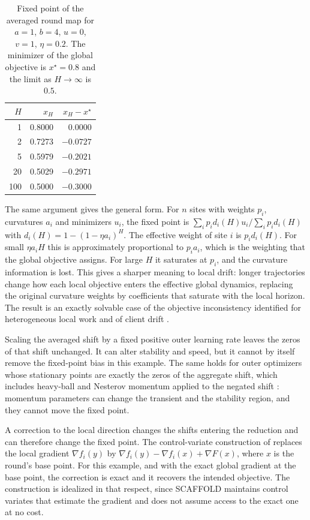\documentclass[11pt]{article}
\theoremstyle{definition}
\theoremstyle{remark}
\begin{document}
\begin{table}[h]
\centering
\begin{tabular}{rrr}
\toprule
$H$ & $x_H$ & $x_H-x^\star$\\
\midrule
1 & 0.8000 & 0.0000\\
2 & 0.7273 & $-0.0727$\\
5 & 0.5979 & $-0.2021$\\
20 & 0.5029 & $-0.2971$\\
100 & 0.5000 & $-0.3000$\\
\bottomrule
\end{tabular}
\caption{Fixed point of the averaged round map for $a=1$, $b=4$, $u=0$, $v=1$, $\eta=0.2$. The minimizer of the global objective is $x^\star=0.8$ and the limit as $H\to\infty$ is $0.5$.}
\label{tab:bias}
\end{table}

The same argument gives the general form. For $n$ sites with weights $p_i$, curvatures $a_i$ and minimizers $u_i$, the fixed point is $\sum_i p_i d_i(H)u_i\big/\sum_i p_id_i(H)$ with $d_i(H)=1-(1-\eta a_i)^H$. The effective weight of site $i$ is $p_id_i(H)$. For small $\eta a_iH$ this is approximately proportional to $p_ia_i$, which is the weighting that the global objective assigns. For large $H$ it saturates at $p_i$, and the curvature information is lost. This gives a sharper meaning to local drift: longer trajectories change how each local objective enters the effective global dynamics, replacing the original curvature weights by coefficients that saturate with the local horizon. The result is an exactly solvable case of the objective inconsistency identified for heterogeneous local work \cite{wang2020} and of client drift \cite{karimireddy2020}.

Scaling the averaged shift by a fixed positive outer learning rate leaves the zeros of that shift unchanged. It can alter stability and speed, but it cannot by itself remove the fixed-point bias in this example. The same holds for outer optimizers whose stationary points are exactly the zeros of the aggregate shift, which includes heavy-ball and Nesterov momentum applied to the negated shift \cite{reddi2021}: momentum parameters can change the transient and the stability region, and they cannot move the fixed point.

A correction to the local direction changes the shifts entering the reduction and can therefore change the fixed point. The control-variate construction of \cite{karimireddy2020} replaces the local gradient $\nabla f_i(y)$ by $\nabla f_i(y)-\nabla f_i(x)+\nabla F(x)$, where $x$ is the round's base point. For this example, and with the exact global gradient at the base point, the correction is exact and it recovers the intended objective. The construction is idealized in that respect, since SCAFFOLD maintains control variates that estimate the gradient and does not assume access to the exact one at no cost.
\end{document}
